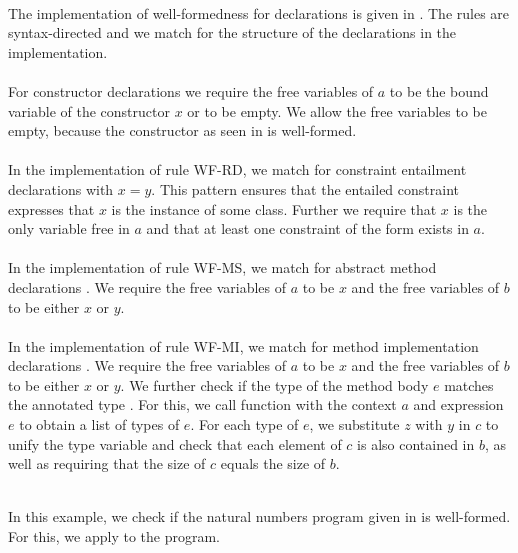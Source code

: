 \\
The implementation of well-formedness for declarations
is given in .
The rules are syntax-directed and we match for the
structure of the declarations in the implementation.\\
\\
For constructor declarations 
we require the free variables of $a$ to be the bound
variable of the constructor $x$ or to be empty.
We allow the free variables to be empty,
because the constructor 
as seen in  is well-formed.\\
\\
In the implementation of rule WF-RD,
we match for constraint entailment declarations 
with $x = y$.
This pattern ensures that the entailed constraint
expresses that $x$ is the instance of some class.
Further we require that $x$ is the only variable free in $a$
and that at least one constraint of the form 
exists in $a$.\\
\\
In the implementation of rule WF-MS,
we match for abstract method declarations .
We require the free variables of $a$ to be $x$
and the free variables of $b$ to be either $x$ or $y$.\\
\\
In the implementation of rule WF-MI,
we match for method implementation declarations .
We require the free variables of $a$ to be $x$
and the free variables of $b$ to be either $x$ or $y$.
We further check if the type of the method body $e$
matches the annotated type .
For this, we call function 
with the context $a$ and expression $e$
to obtain a list of types of $e$.
For each type  of $e$, we
substitute $z$ with $y$ in $c$ to unify the type variable
and check that each element of $c$ is also contained in $b$,
as well as requiring that the size of $c$ equals the size of $b$.

\begin{example}\quad\\
In this example, we check if the natural numbers program
given in  is well-formed.
For this, we apply  to the program.

\end{example}

